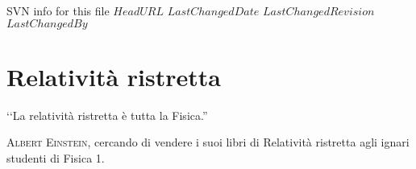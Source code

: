  SVN info for this file
\svnidlong
{$HeadURL$}
{$LastChangedDate$}
{$LastChangedRevision$}
{$LastChangedBy$}

\chapter{Relatività ristretta}

\begin{introduction}
	‘‘La relatività ristretta è tutta la Fisica.''
	\begin{flushright}
		\textsc{Albert Einstein,} cercando di vendere i suoi libri di Relatività ristretta agli ignari studenti di Fisica 1.
	\end{flushright}
\end{introduction}

%
%
%
%
%
%
%
%		
%
%
%
